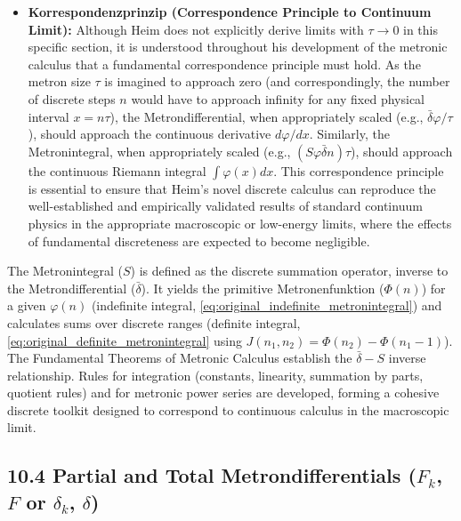 \documentclass[12pt]{article}
\newcommand{\metron}{\tau}
\newcommand{\metronintegral}{S}
\newcommand{\metronenziffer}{n}
\begin{document}
\begin{itemize}
    \item \textbf{Korrespondenzprinzip (Correspondence Principle to Continuum Limit):}
    Although Heim does not explicitly derive limits with \( \metron \to 0 \) in this specific section, it is understood throughout his development of the metronic calculus that a fundamental correspondence principle must hold. As the metron size \( \metron \) is imagined to approach zero (and correspondingly, the number of discrete steps \( \metronenziffer \) would have to approach infinity for any fixed physical interval \( x = \metronenziffer\metron \)), the Metrondifferential, when appropriately scaled (e.g., \( \bar{\delta}\varphi/\metron \)), should approach the continuous derivative \( d\varphi/dx \). Similarly, the Metronintegral, when appropriately scaled (e.g., \( (\metronintegral\varphi \bar{\delta}\metronenziffer)\metron \)), should approach the continuous Riemann integral \( \int\varphi(x)dx \). This correspondence principle is essential to ensure that Heim's novel discrete calculus can reproduce the well-established and empirically validated results of standard continuum physics in the appropriate macroscopic or low-energy limits, where the effects of fundamental discreteness are expected to become negligible.
\end{itemize}

The Metronintegral (\(\metronintegral\)) is defined as the discrete summation operator, inverse to the Metrondifferential (\(\bar{\delta}\)). It yields the primitive Metronenfunktion (\(\Phi(n)\)) for a given \(\varphi(n)\) (indefinite integral, \eqref{eq:original_indefinite_metronintegral}) and calculates sums over discrete ranges (definite integral, \eqref{eq:original_definite_metronintegral} using \(J(n_1,n_2) = \Phi(n_2) - \Phi(n_1-1)\)). The Fundamental Theorems of Metronic Calculus establish the \(\bar{\delta}-S\) inverse relationship. Rules for integration (constants, linearity, summation by parts, quotient rules) and for metronic power series are developed, forming a cohesive discrete toolkit designed to correspond to continuous calculus in the macroscopic limit.

\subsection{10.4 Partial and Total Metrondifferentials (\texorpdfstring{\( F_k \)}{Fk}, \texorpdfstring{\( F \)}{F} or \texorpdfstring{\( \delta_k \)}{delta-k}, \texorpdfstring{\( \delta \)}{delta})}
\label{sec:partial_total_delta}
\end{document}
